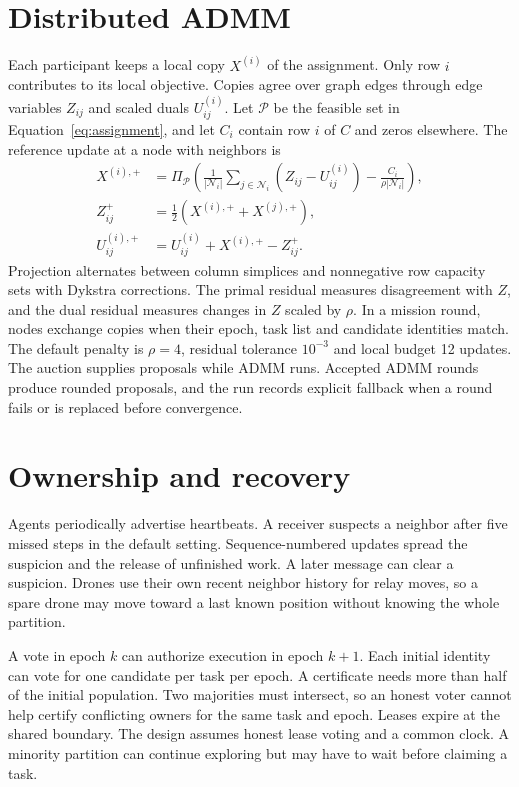\section{Distributed ADMM}
Each participant keeps a local copy $X^{(i)}$ of the assignment. Only row $i$ contributes to its local objective. Copies agree over graph edges through edge variables $Z_{ij}$ and scaled duals $U_{ij}^{(i)}$. Let $\mathcal P$ be the feasible set in Equation~\ref{eq:assignment}, and let $C_i$ contain row $i$ of $C$ and zeros elsewhere. The reference update at a node with neighbors is
\begin{equation}
\begin{aligned}
X^{(i),+} &=
  \Pi_{\mathcal P}\left(
    \frac{1}{|\mathcal N_i|}\sum_{j\in\mathcal N_i}
      (Z_{ij}-U_{ij}^{(i)})
    -\frac{C_i}{\rho|\mathcal N_i|}
  \right),\\
Z_{ij}^{+} &=\tfrac12\left(X^{(i),+}+X^{(j),+}\right),\\
U_{ij}^{(i),+} &= U_{ij}^{(i)}+X^{(i),+}-Z_{ij}^{+}.
\end{aligned}
\label{eq:admm}
\end{equation}
Projection alternates between column simplices and nonnegative row capacity sets with Dykstra corrections. The primal residual measures disagreement with $Z$, and the dual residual measures changes in $Z$ scaled by $\rho$. In a mission round, nodes exchange copies when their epoch, task list and candidate identities match. The default penalty is $\rho=4$, residual tolerance $10^{-3}$ and local budget 12 updates. The auction supplies proposals while ADMM runs. Accepted ADMM rounds produce rounded proposals, and the run records explicit fallback when a round fails or is replaced before convergence.

\section{Ownership and recovery}
Agents periodically advertise heartbeats. A receiver suspects a neighbor after five missed steps in the default setting. Sequence-numbered updates spread the suspicion and the release of unfinished work. A later message can clear a suspicion. Drones use their own recent neighbor history for relay moves, so a spare drone may move toward a last known position without knowing the whole partition.

A vote in epoch $k$ can authorize execution in epoch $k+1$. Each initial identity can vote for one candidate per task per epoch. A certificate needs more than half of the initial population. Two majorities must intersect, so an honest voter cannot help certify conflicting owners for the same task and epoch. Leases expire at the shared boundary. The design assumes honest lease voting and a common clock. A minority partition can continue exploring but may have to wait before claiming a task.

